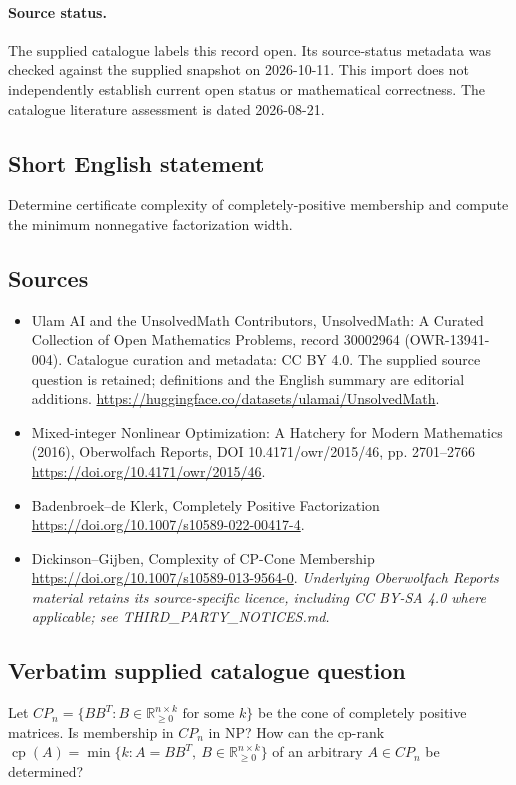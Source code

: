 \documentclass[11pt]{article}
\begin{document}
\paragraph{Source status.}
The supplied catalogue labels this record open. Its source-status metadata was checked against the supplied snapshot on 2026-10-11. This import does not independently establish current open status or mathematical correctness. The catalogue literature assessment is dated 2026-08-21.
\subsection{Short English statement}
Determine certificate complexity of completely-positive membership and compute the minimum nonnegative factorization width.
\subsection{Sources}
\begin{itemize}
\item[S1] Ulam AI and the UnsolvedMath Contributors, UnsolvedMath: A Curated Collection of Open Mathematics Problems, record 30002964 (OWR-13941-004). Catalogue curation and metadata: CC BY 4.0. The supplied source question is retained; definitions and the English summary are editorial additions.
\url{https://huggingface.co/datasets/ulamai/UnsolvedMath}.
\item[S2] Mixed-integer Nonlinear Optimization: A Hatchery for Modern Mathematics (2016), Oberwolfach Reports, DOI 10.4171/owr/2015/46, pp. 2701--2766
\url{https://doi.org/10.4171/owr/2015/46}.
\item[S3] Badenbroek--de Klerk, Completely Positive Factorization
\url{https://doi.org/10.1007/s10589-022-00417-4}.
\item[S4] Dickinson--Gijben, Complexity of CP-Cone Membership
\url{https://doi.org/10.1007/s10589-013-9564-0}.
\textit{Underlying Oberwolfach Reports material retains its source-specific licence, including CC BY-SA 4.0 where applicable; see THIRD\_PARTY\_NOTICES.md.}
\end{itemize}
\subsection{Verbatim supplied catalogue question}
Let $CP_n=\{BB^T:B\in\mathbb R_{\geq0}^{n\times k}\text{ for some }k\}$ be the cone of completely positive matrices. Is membership in $CP_n$ in NP? How can the cp-rank $\operatorname{cp}(A)=\min\{k:A=BB^T,\ B\in\mathbb R_{\geq0}^{n\times k}\}$ of an arbitrary $A\in CP_n$ be determined?
\end{document}
